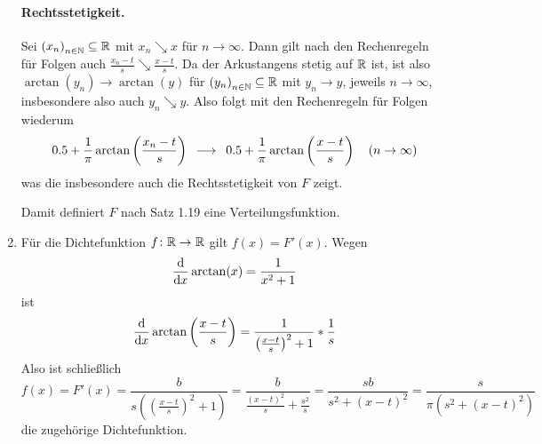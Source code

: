 \begin{exercisePage}
\begin{enumerate}[leftmargin=*, label=(\alph*)]
        \paragraph{Rechtsstetigkeit.} Sei $\folge{x_n} \subseteq \R$ mit $x_n \searrow x$ für $n \to \infty$. Dann gilt nach den Rechenregeln für Folgen auch $\frac{x_n - t}{s} \searrow \frac{x - t}{s}$. Da der Arkustangens stetig auf $\mathbb{R}$ ist, ist also $\arctan(y_n) \to \arctan(y)$ für $\folge{y_n} \subseteq \R$ mit $y_n \to y$, jeweils $n \to \infty$, insbesondere also auch $y_n \searrow y$. Also folgt mit den Rechenregeln für Folgen wiederum
        \begin{equation*}
        0.5 + \frac{1}{\pi} \arctan \left( \frac{x_n-t}{s} \right) \enskip \longrightarrow \enskip 0.5 + \frac{1}{\pi} \arctan \left( \frac{x-t}{s} \right) \quad (n \to \infty)
        \end{equation*}
        was die insbesondere auch die Rechtsstetigkeit von $F$ zeigt. 
        
        Damit definiert $F$ nach Satz 1.19 eine Verteilungsfunktion.
        \item Für die Dichtefunktion $\abb{f}{\R}{\R}$ gilt $f(x) = F'(x)$. Wegen
        \begin{equation*}
            \frac{\mathrm{d}}{\mathrm{d} x } \arctan(x) = \frac{1}{x^2 + 1}
        \end{equation*}
        ist
        \begin{equation*}
            \frac{\mathrm{d}}{\mathrm{d} x } \arctan\left(\frac{x-t}{s}\right) = \frac{1}{\left(\frac{x-t}{s}\right)^2 + 1} * \frac{1}{s}
        \end{equation*}
        Also ist schließlich
        \begin{equation*}
            f(x) = F'(x) = \frac{b}{s \left( \left( \frac{x-t}{s} \right)^2 + 1 \right)}
            = \frac{b}{\frac{(x-t)^2}{s} + \frac{s^2}{s}} 
            = \frac{sb}{s^2 + (x-t)^2} 
            = \frac{s}{\pi \left( s^2 + (x-t)^2 \right)}
        \end{equation*}
        die zugehörige Dichtefunktion.
    \end{enumerate}



\end{exercisePage}

